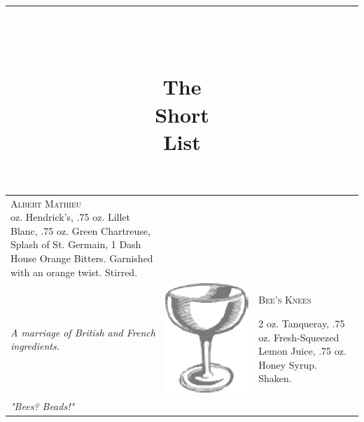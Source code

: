 \documentclass{article}
\title{\vspace{-1in}\rule{\textwidth}{1.5pt}\\\begin{spacing}{.4}\textbf{\Huge\color{BrickRed} The\\Short\\List}\end{spacing}\vspace{-.5in}}
\date{}
\begin{document}
\begin{tabular}{m{}m{}m{}}
{\raggedleft\huge\textsc{Albert Mathieu}\\*}
\raggedleft 2 oz. Hendrick's, .75 oz. Lillet Blanc, .75 oz. Green Chartreuse, Splash of St. Germain, 1 Dash House Orange Bitters. Garnished with an orange twist. Stirred.\\
\raggedleft\small\textit{A marriage of British and French ingredients.}
& 
\raggedright\includegraphics{egg_coupe.png}
&
{\raggedright\huge\textsc{Bee's Knees}\\*}
\raggedright 2 oz. Tanqueray, .75 oz. Fresh-Squeezed Lemon Juice, .75 oz. Honey Syrup. Shaken.\\
\raggedright\small\textit{"Bees? Beads!"}
\end{tabular}
\end{document}
